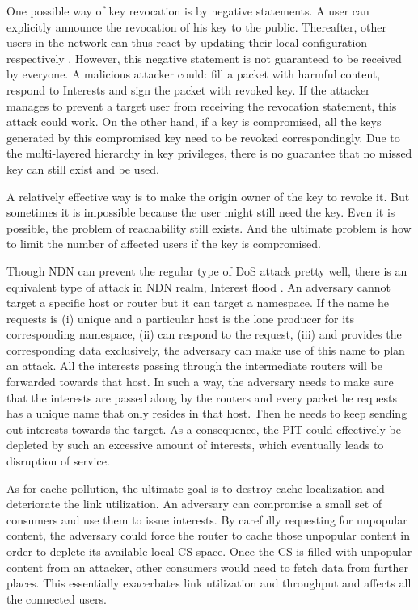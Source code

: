 \documentclass[conference,compsoc]{IEEEtran}
\begin{document}
One possible way of key revocation is by negative statements. A user can explicitly announce the revocation of his key to the public. Thereafter, other users in the network can thus react by updating their local configuration respectively \cite{yupublic}. However, this negative statement is not guaranteed to be received by everyone. A malicious attacker could: fill a packet with harmful content, respond to Interests and sign the packet with revoked key. If the attacker manages to prevent a target user from receiving the revocation statement, this attack could work. On the other hand, if a key is compromised, all the keys generated by this compromised key need to be revoked correspondingly. Due to the multi-layered hierarchy in key privileges, there is no guarantee that no missed key can still exist and be used. 

A relatively effective way is to make the origin owner of the key to revoke it. But sometimes it is impossible because the user might still need the key. Even it is possible, the problem of reachability still exists. And the ultimate problem is how to limit the number of affected users if the key is compromised.

Though NDN can prevent the regular type of DoS attack pretty well, there is an equivalent type of attack in NDN realm, Interest flood \cite{gasti2013and}. An adversary cannot target a specific host or router but it can target a namespace. If the name he requests is (i) unique and a particular host is the lone producer for its corresponding namespace, (ii) can respond to the request, (iii) and provides the corresponding data exclusively, the adversary can make use of this name to plan an attack. All the interests passing through the intermediate routers will be forwarded towards that host. In such a way, the adversary needs to make sure that the interests are passed along by the routers and every packet he requests has a unique name that only resides in that host. Then he needs to keep sending out interests towards the target. As a consequence, the PIT could effectively be depleted by such an excessive amount of interests, which eventually leads to disruption of service.

As for cache pollution, the ultimate goal is to destroy cache localization and deteriorate the link utilization. An adversary can compromise a small set of consumers and use them to issue interests. By carefully requesting for unpopular content, the adversary could force the router to cache those unpopular content in order to deplete its available local CS space. Once the CS is filled with unpopular content from an attacker, other consumers would need to fetch data from further places. This essentially exacerbates link utilization and throughput and affects all the connected users.
\end{document}
